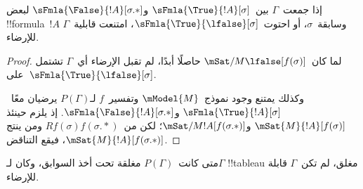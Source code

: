 \documentclass[../../../include/open-logic-section]{subfiles}
\begin{document}
\begin{prop}
  إذا جمعت~$\Gamma$ بين~$\sFmla{\True}{!A}[\sigma]$
  و$\sFmla{\False}{!A}[\sigma.{*}]$ لبعض !!{formula}~$!A$
  وسابقة~$\sigma$، أو احتوت~$\sFmla{\True}{\lfalse}[\sigma]$،
  امتنعت قابلية~$\Gamma$ للإرضاء.
\end{prop}

\begin{proof}
  لما كان~$\mSat/{M}{\lfalse}[f(\sigma)]$ حاصلًا أبدًا، لم تقبل
  الإرضاء أي~$\Gamma$ تشتمل على~$\sFmla{\True}{\lfalse}[\sigma]$.

  وكذلك يمتنع وجود نموذج~$\mModel{M}$ وتفسير~$f$ لـ$P(\Gamma)$
  يرضيان معًا~$\sFmla{\True}{!A}[\sigma]$
  و$\sFmla{\False}{!A}[\sigma.{*}]$. إذ يلزم حينئذ
  $\mSat{M}{!A}[f(\sigma)]$ و$\mSat/{M}{!A}[f(\sigma.{*})]$؛
  لكن من~$Rf(\sigma)f(\sigma.{*})$ ومن
   ينتج
  $\mSat{M}{!A}[f(\sigma.{*})]$، فيقع التناقض.
\end{proof}

\begin{thm}[السلامة]
  متى كانت~$P(\Gamma)$ مغلقة تحت أخذ السوابق، وكان لـ$\Gamma$
  !!{tableau} مغلق، لم تكن~$\Gamma$ قابلة للإرضاء.
\end{thm}
\end{document}
